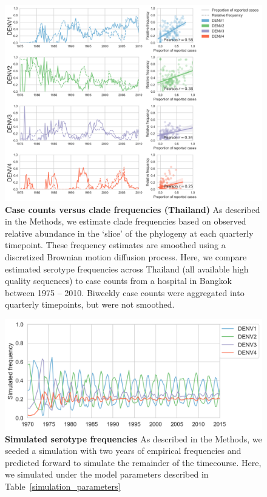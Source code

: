 \documentclass[11pt,oneside,letterpaper]{article}
\begin{document}
\begin{figure}[ht]
  \centering
  \includegraphics[width=\textwidth]{../figures/png/thai_frequencies_comparison.png}
  \caption{\textbf{Case counts versus clade frequencies (Thailand)}
  As described in the Methods, we estimate clade frequencies based on observed relative abundance in the `slice' of the phylogeny at each quarterly timepoint.
  These frequency estimates are smoothed using a discretized Brownian motion diffusion process.
  Here, we compare estimated serotype frequencies across Thailand (all available high quality sequences) to case counts from a hospital in Bangkok between 1975 -- 2010\citep{reich2013interactions}.
  Biweekly case counts were aggregated into quarterly timepoints, but were not smoothed.}
\label{thai_frequencies_comparison}
\end{figure}


\begin{figure}[ht]
  \centering
  \includegraphics[width=\textwidth]{../figures/png/simulated_frequencies_high_beta.png}
  \caption{\textbf{Simulated serotype frequencies}
  As described in the Methods, we seeded a simulation with two years of empirical frequencies and predicted forward to simulate the remainder of the timecourse.
  Here, we simulated under the model parameters described in Table~\ref{simulation_parameters}}
\label{simulation_parameter_recovery}
\end{figure}
\end{document}

